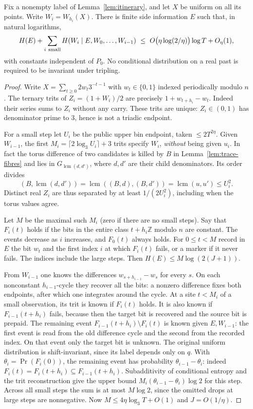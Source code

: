 \begin{lemma}\label{lem:small-traces}
Fix a nonempty label of Lemma~\ref{lem:itinerary}, and let $X$ be
uniform on all its points. Write $W_i=W_{h_i}(X)$.
There is finite side information $E$ such that, in natural logarithms,
\[
 H(E)+\sum_{i\ {\rm small}} H(W_i\mid E,W_0,\ldots,W_{i-1})
 \ \le\ O\big(\eta\log(2/\eta)\big)\log T+O_\eta(1),
\]
with constants independent of $P_0$. No conditional distribution on a
real past is required to be invariant under tripling.
\end{lemma}
\begin{proof}
Write $X=\sum_{t\ge0}2w_t3^{-t-1}$ with $w_t\in\{0,1\}$ indexed
periodically modulo $n$. The ternary trits of
$Z_i=(1+W_i)/2$ are precisely $1+w_{t+h_i}-w_t$. Indeed their
series sums to $Z_i$ without any carry. These trits are unique:
$Z_i\in(0,1)$ has denominator prime to $3$, hence is not a triadic
endpoint.

For a small step let $U_i$ be the public upper bin endpoint, taken
$\le2T^{2\eta}$. Given $W_{i-1}$, the first
$M_i=\lceil 2\log_3 U_i\rceil+3$ trits specify $W_i$,
\emph{without} being given $u_i$. In fact the torus difference of
two candidates is killed by $B$ in Lemma~\ref{lem:trace-fibres}
and lies in $G_{\operatorname{lcm}(d,d')}$, where
$d,d'$ are their child denominators. Its order divides
\[
 (B,\operatorname{lcm}(d,d'))
 =\operatorname{lcm}((B,d),(B,d'))
 =\operatorname{lcm}(u,u')\le U_i^2.
\]
Distinct real $Z_i$ are thus separated by at least $1/(2U_i^2)$,
including when the torus values agree.

Let $M$ be the maximal such $M_i$ (zero if there are no small
steps). Say that $F_i(t)$ holds if the bits in the entire class
$t+h_i\mathbb Z$ modulo $n$ are constant.  The events decrease as
$i$ increases, and $F_0(t)$ always holds. For $0\le t<M$ record in
$E$ the bit $w_t$ and the first index $i$ at which $F_i(t)$ fails,
or a marker if it never fails. The indices include the large steps.
Then $H(E)\le M\log(2(J+1))$.

From $W_{i-1}$ one knows the differences
$w_{s+h_{i-1}}-w_s$ for every $s$. On each nonconstant
$h_{i-1}$-cycle they recover all the bits: a nonzero difference
fixes both endpoints, after which one integrates around the cycle.
At a site $t<M_i$ of a small observation, its trit is known if
$F_i(t)$ holds. It is also known if $F_{i-1}(t+h_i)$ fails, because
then the target bit is recovered and the source bit is prepaid.
The remaining event
$F_{i-1}(t+h_i)\setminus F_i(t)$ is known given $E,W_{i-1}$:
the first event is read from the old difference cycle and the
second from the recorded index. On that event only the target bit
is unknown. The original uniform distribution is shift-invariant,
since its label depends only on $q$. With $\theta_i=\Pr(F_i(0))$,
the remaining event has probability $\theta_{i-1}-\theta_i$:
indeed $F_i(t)=F_i(t+h_i)\subseteq F_{i-1}(t+h_i)$.
Subadditivity of conditional entropy and the trit reconstruction
give the upper bound $M_i(\theta_{i-1}-\theta_i)\log 2$ for this
step. Across all small steps the sum is at most $M\log 2$, since
the omitted drops at large steps are nonnegative. Now
$M\le4\eta\log_3 T+O(1)$ and $J=O(1/\eta)$.
\end{proof}

